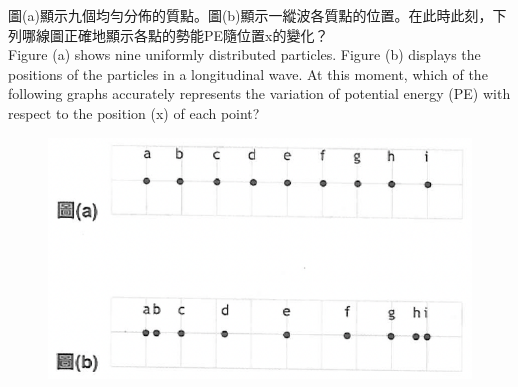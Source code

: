 \documentclass[beamer=true]{standalone}
\begin{document}
\begin{frame}[t]{}
    圖(a)顯示九個均勻分佈的質點。圖(b)顯示一縱波各質點的位置。在此時此刻，下列哪線圖正確地顯示各點的勢能PE隨位置x的變化？\\Figure (a) shows nine uniformly distributed particles. Figure (b) displays the positions of the particles in a longitudinal wave. At this moment, which of the following graphs accurately represents the variation of potential energy (PE) with respect to the position (x) of each point?
    \begin{figure}
        \centering
        \includegraphics[width=0.7\linewidth]{images/Screenshot 2023-09-27 at 8.21.03 AM.png}


    \end{figure}

\end{frame}
\end{document}
